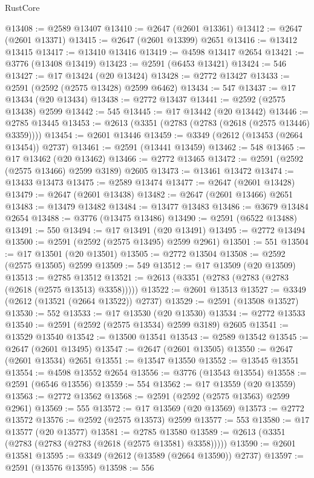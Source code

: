 \begin{lexlean}{RustCore}
\begin{coremodule}
@13408 := @2589 @13407
@13410 := @2647 (@2601 @13361)
@13412 := @2647 (@2601 @13371)
@13415 := @2647 (@2601 @13399) @2651
@13416 := @13412 @13415
@13417 := @13410 @13416
@13419 := @4598 @13417 @2654
@13421 := @3776 (@13408 @13419)
@13423 := @2591 (@6453 @13421)
@13424 := 546
@13427 := @17 @13424 (@20 @13424)
@13428 := @2772 @13427
@13433 := @2591 (@2592 (@2575 @13428) @2599 @6462)
@13434 := 547
@13437 := @17 @13434 (@20 @13434)
@13438 := @2772 @13437
@13441 := @2592 (@2575 @13438) @2599
@13442 := 545
@13445 := @17 @13442 (@20 @13442)
@13446 := @2785 @13445
@13453 := @2613 (@3351 (@2783 (@2783 (@2618 (@2575 @13446) @3359))))
@13454 := @2601 @13446
@13459 := @3349 (@2612 (@13453 (@2664 @13454)) @2737)
@13461 := @2591 (@13441 @13459)
@13462 := 548
@13465 := @17 @13462 (@20 @13462)
@13466 := @2772 @13465
@13472 := @2591 (@2592 (@2575 @13466) @2599 @3189) @2605
@13473 := @13461 @13472
@13474 := @13433 @13473
@13475 := @2589 @13474
@13477 := @2647 (@2601 @13428)
@13479 := @2647 (@2601 @13438)
@13482 := @2647 (@2601 @13466) @2651
@13483 := @13479 @13482
@13484 := @13477 @13483
@13486 := @3679 @13484 @2654
@13488 := @3776 (@13475 @13486)
@13490 := @2591 (@6522 @13488)
@13491 := 550
@13494 := @17 @13491 (@20 @13491)
@13495 := @2772 @13494
@13500 := @2591 (@2592 (@2575 @13495) @2599 @2961)
@13501 := 551
@13504 := @17 @13501 (@20 @13501)
@13505 := @2772 @13504
@13508 := @2592 (@2575 @13505) @2599
@13509 := 549
@13512 := @17 @13509 (@20 @13509)
@13513 := @2785 @13512
@13521 := @2613 (@3351 (@2783 (@2783 (@2783 (@2618 (@2575 @13513) @3358)))))
@13522 := @2601 @13513
@13527 := @3349 (@2612 (@13521 (@2664 @13522)) @2737)
@13529 := @2591 (@13508 @13527)
@13530 := 552
@13533 := @17 @13530 (@20 @13530)
@13534 := @2772 @13533
@13540 := @2591 (@2592 (@2575 @13534) @2599 @3189) @2605
@13541 := @13529 @13540
@13542 := @13500 @13541
@13543 := @2589 @13542
@13545 := @2647 (@2601 @13495)
@13547 := @2647 (@2601 @13505)
@13550 := @2647 (@2601 @13534) @2651
@13551 := @13547 @13550
@13552 := @13545 @13551
@13554 := @4598 @13552 @2654
@13556 := @3776 (@13543 @13554)
@13558 := @2591 (@6546 @13556)
@13559 := 554
@13562 := @17 @13559 (@20 @13559)
@13563 := @2772 @13562
@13568 := @2591 (@2592 (@2575 @13563) @2599 @2961)
@13569 := 555
@13572 := @17 @13569 (@20 @13569)
@13573 := @2772 @13572
@13576 := @2592 (@2575 @13573) @2599
@13577 := 553
@13580 := @17 @13577 (@20 @13577)
@13581 := @2785 @13580
@13589 := @2613 (@3351 (@2783 (@2783 (@2783 (@2618 (@2575 @13581) @3358)))))
@13590 := @2601 @13581
@13595 := @3349 (@2612 (@13589 (@2664 @13590)) @2737)
@13597 := @2591 (@13576 @13595)
@13598 := 556

\end{coremodule}
\end{lexlean}
